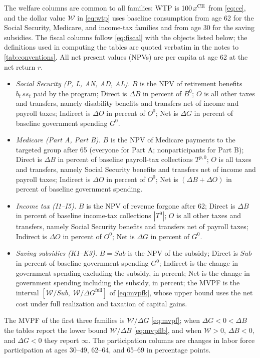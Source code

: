 The welfare columns are common to all families: WTP is $100\,x^{\mathrm{CE}}$ from \eqref{eq:ce}, and the dollar value $\mathcal{W}$ in \eqref{eq:wtp} uses baseline consumption from age 62 for the Social Security, Medicare, and income-tax families and from age 30 for the saving subsidies. %
The fiscal columns follow \eqref{eq:fiscal} with the objects listed below; the definitions used in computing the tables are quoted verbatim in the notes to \autoref{tab:conventions}. All net present values (NPVs) are per capita at age 62 at the net return $r$. %
\begin{itemize}[nosep,leftmargin=1.5em]
\item \emph{Social Security (P, L, AN, AD, AL).} $B$ is the NPV of retirement benefits $b_t\,ss_t$ paid by the program; Direct is $\Delta B$ in percent of $B^{0}$; $O$ is all other taxes and transfers, namely disability benefits and transfers net of income and payroll taxes; Indirect is $\Delta O$ in percent of $O^{0}$; Net is $\Delta G$ in percent of baseline government spending $G^{0}$. %
\item \emph{Medicare (Part A, Part B).} $B$ is the NPV of Medicare payments to the targeted group after 65 (everyone for Part A; nonparticipants for Part B); Direct is $\Delta B$ in percent of baseline payroll-tax collections $T^{p,0}$; $O$ is all taxes and transfers, namely Social Security benefits and transfers net of income and payroll taxes; Indirect is $\Delta O$ in percent of $O^{0}$; Net is $(\Delta B+\Delta O)$ in percent of baseline government spending. %
\item \emph{Income tax (I1--I5).} $B$ is the NPV of revenue forgone after 62; Direct is $\Delta B$ in percent of baseline income-tax collections $|T^{0}|$; $O$ is all other taxes and transfers, namely Social Security benefits and transfers net of payroll taxes; Indirect is $\Delta O$ in percent of $O^{0}$; Net is $\Delta G$ in percent of $G^{0}$. %
\item \emph{Saving subsidies (K1--K3).} $B=\mathit{Sub}$ is the NPV of the subsidy; Direct is $\mathit{Sub}$ in percent of baseline government spending $G^{0}$; Indirect is the change in government spending excluding the subsidy, in percent; Net is the change in government spending including the subsidy, in percent; the MVPF is the interval $[\mathcal{W}/\mathit{Sub},\;\mathcal{W}/\Delta G^{\mathrm{full}}]$ of \eqref{eq:mvpfk}, whose upper bound uses the net cost under full realization and taxation of capital gains. %
\end{itemize}
The MVPF of the first three families is $\mathcal{W}/\Delta G$ \eqref{eq:mvpf}; when $\Delta G<0<\Delta B$ the tables report the lower bound $\mathcal{W}/\Delta B$ \eqref{eq:mvpflb}, and when $\mathcal{W}>0$, $\Delta B<0$, and $\Delta G<0$ they report $\infty$. %
The participation columns are changes in labor force participation at ages 30--49, 62--64, and 65--69 in percentage points. %

